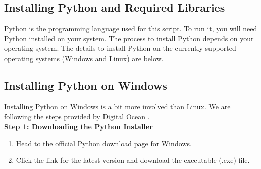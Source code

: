 \documentclass[
	a4paper, %
	12pt, %
]{CSSullivanBusinessReport}
\begin{document}
\newpage

\begin{fullwidth}
\section{Installing Python and Required Libraries} %

Python is the programming language used for this script. To run it, you  will need Python installed on your system. The process to install Python depends on your operating system. The details to install Python on the currently supported operating systems (Windows and Linux) are below.

\subsection{Installing Python on Windows}
Installing Python on Windows is a bit more involved than Linux. We are following the steps provided by Digital Ocean \cite{Gangwar2023Feb}.\\ 

\textbf{\underline{Step 1:  Downloading the Python Installer}}\\
\begin{enumerate}
\item Head to the \href{https://www.python.org/downloads/windows/}{\underline{official Python download page for Windows. }}
\item Click the link for the latest version and download the executable (.exe) file.
\end{enumerate}


\end{fullwidth}
\end{document}
